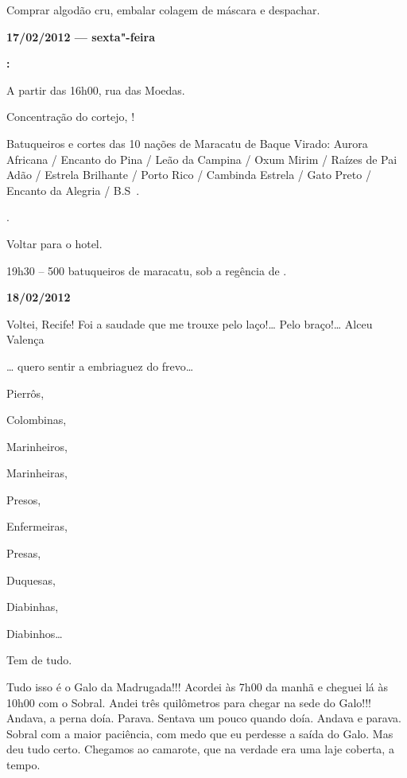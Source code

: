 Comprar algodão cru, embalar colagem de máscara e despachar.

\begin{flushright}\textbf{}\end{flushright}

\begin{flushright}\textbf{17/02/2012 --- sexta"-feira}\end{flushright}


\textbf{:}

A partir das 16h00, rua das Moedas.

Concentração do cortejo,  !

Batuqueiros e cortes das 10 nações de Maracatu de Baque Virado: Aurora
Africana / Encanto do Pina / Leão da Campina / Oxum Mirim / Raízes de
Pai Adão / Estrela Brilhante / Porto Rico / Cambinda Estrela / Gato
Preto / Encanto da Alegria /  B.S\,  .

  .

Voltar para o hotel.

19h30 -- 500 batuqueiros de maracatu, sob a regência de 
.

\begin{flushright}\textbf{18/02/2012}\end{flushright}


Voltei, Recife! Foi a saudade que me trouxe pelo laço!… Pelo
braço!… Alceu Valença

… quero sentir a embriaguez do frevo…

Pierrôs,

Colombinas,

Marinheiros,

Marinheiras,

Presos,

Enfermeiras,

Presas,

Duquesas,

Diabinhas,

Diabinhos…

Tem de tudo.

Tudo isso é o Galo da Madrugada!!! Acordei às 7h00 da manhã e cheguei lá
às 10h00 com o Sobral. Andei três quilômetros para chegar na sede do
Galo!!! Andava, a perna doía. Parava. Sentava um pouco quando doía.
Andava e parava. Sobral com a maior paciência, com medo que eu perdesse
a saída do Galo. Mas deu tudo certo. Chegamos ao camarote, que na
verdade era uma laje coberta, a tempo.

